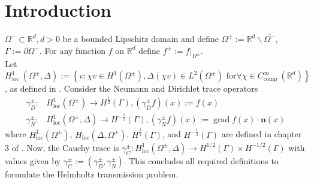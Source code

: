 \documentclass[12pt,journal,compsoc, onecolumn]{IEEEtran}
\begin{document}
\section{Introduction}
\label{section:introduction}
 \(\Omega^- \subset \mathbb{R}^d, d > 0\) be a bounded Lipschitz domain and 
define \(\Omega^{+}:=\mathbb{R}^{d} \backslash \overline{\Omega^{-}}\), 
\(\Gamma := \partial \Omega^-\).
For any function $f$ on $\mathbb{R}^d$ define $f^\pm :=f|_{\Omega^{\pm}}$. \\
Let \(H_{\text {loc }}^{1}\left(\Omega^{\pm}, \Delta\right):=\left\{v: \chi v \in H^{1}\left(\Omega^{\pm}\right), \Delta(\chi v) \in L^{2}\left(\Omega^{\pm}\right) \text{ for} \forall\chi \in C_{\text {comp }}^{\infty}\left(\mathbb{R}^{d}\right)\right\}\), as defined in \cite{hiptmair2021spurious}.
Consider the Neumann and Dirichlet trace operators 
\begin{align}
    \gamma_{D}^{\pm}: & H_{\mathrm{loc}}^{1}\left(\Omega^{\pm}\right) \rightarrow H^{\frac{1}{2}}(\Gamma), \left(\gamma_{D}^{\pm} f\right)({x}):=f({x}) \nonumber \\
    \gamma_{N}^{\pm}: & H_{\mathrm{loc}}^1\left(\Omega^{\pm}, \Delta\right) \rightarrow H^{-\frac{1}{2}}(\Gamma), \left(\gamma_{N}^{\pm} f\right)({x}):=\operatorname{grad} f({x}) \cdot \mathbf{n}({x}) \nonumber
\end{align}
where \(H_{\mathrm{loc}}^{1}\left(\Omega^{\pm}\right)\),
\(H_{\mathrm{loc}}\left(\Delta, \Omega^{\pm}\right)\), 
\(H^{\frac{1}{2}}(\Gamma)\), and \(H^{-\frac{1}{2}}(\Gamma)\)
are defined in chapter 3 of  \cite{mclean2000strongly}.
Now, the Cauchy trace is \(\gamma_{C}^{\pm}: H_{\mathrm{loc}}^{1}\left(\Omega^{\pm}, \Delta\right) \rightarrow H^{1 / 2}(\Gamma) \times H^{-1 / 2}(\Gamma)\) with values given 
by \(\gamma_{C}^{\pm}:=\left(\gamma_{D}^{\pm}, \gamma_{N}^{\pm}\right)\). 
This concludes all required definitions to formulate the Helmholtz transmission problem.
\end{document}
